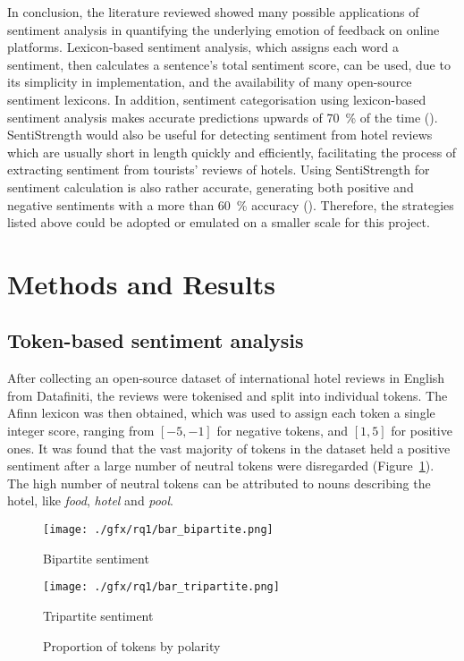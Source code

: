 \documentclass[12pt, a4paper]{pancake-article}
\begin{document}
In conclusion, the literature reviewed showed many possible applications
of sentiment analysis in quantifying the underlying emotion of feedback
on online platforms. Lexicon-based sentiment analysis, which assigns each
word a sentiment, then calculates a sentence's total sentiment score, can
be used, due to its simplicity in implementation, and the availability of
many open-source sentiment lexicons. In addition, sentiment categorisation
using lexicon-based sentiment analysis makes accurate predictions upwards of
\qty{70}{\percent} of the time (\cite{khoo}). SentiStrength would also be useful for
detecting sentiment from hotel reviews which are usually short in length quickly
and efficiently, facilitating the process of extracting sentiment from tourists'
reviews of hotels. Using SentiStrength for sentiment calculation is also
rather accurate, generating both positive and negative sentiments with a more
than \qty{60}{\percent} accuracy (\cite{thelwall}). Therefore, the strategies listed
above could be adopted or emulated on a smaller scale for this project.

\section{Methods and Results}

\subsection{Token-based sentiment analysis}\label{sec:tokens}
After collecting an open-source dataset of international hotel reviews in English from Datafiniti,
the reviews were tokenised and split into individual tokens. The Afinn lexicon was then obtained,
which was used to assign each token a single integer score, ranging from \(\left[-5, -1\right]\) for
negative tokens, and \(\left[1, 5\right]\) for positive ones. It was found that the vast majority
of tokens in the dataset held a positive sentiment  after a large number of neutral tokens were disregarded
(Figure~\ref{fig:bars}). The high number of neutral tokens can be attributed to nouns
describing the hotel, like \textit{food}, \textit{hotel} and \textit{pool}.

\begin{figure}[htpb]
	\centering
	\begin{minipage}{0.5\textwidth}
		\centering
		\texttt{[image: ./gfx/rq1/bar\_bipartite.png]}
		\caption*{Bipartite sentiment}
	\end{minipage}\hfill
	\begin{minipage}{0.5\textwidth}
		\centering
		\texttt{[image: ./gfx/rq1/bar\_tripartite.png]}
		\caption*{Tripartite sentiment}
	\end{minipage}
	\caption{Proportion of tokens by polarity}
	\label{fig:bars}
\end{figure}
\end{document}
